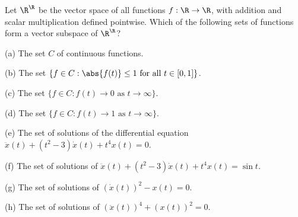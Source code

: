 \begin{problem}
Let $\R^\R$ be the vector space of all functions $f : \R \to \R$, with addition and scalar multiplication defined pointwise. Which of the following sets of functions form a vector subspace of $\R^\R$?
\ben
\item [(a)] The set $C$ of continuous functions.
\item [(b)] The set $\{f \in C : \abs{f(t)}\leq 1\text{ for all }t \in [0, 1]\}$.
\item [(c)] The set $\{f \in C : f(t) \to 0 \text{ as }t \to \infty\}$.
\item [(d)] The set $\{f \in C : f(t) \to 1 \text{ as }t \to \infty\}$.
\item [(e)] The set of solutions of the differential equation $\ddot{x}(t) + (t^2 - 3)\dot{x}(t) + t^4x(t) = 0$.
\item [(f)] The set of solutions of $\ddot{x}(t) + (t^2 - 3)\dot{x}(t) + t^4x(t) = \sin t$.
\item [(g)] The set of solutions of $(\dot{x}(t))^2 - x(t) = 0$.
\item [(h)] The set of solutions of $(\ddot{x}(t))^4 + (x(t))^2 = 0$.
\een
\end{problem}

